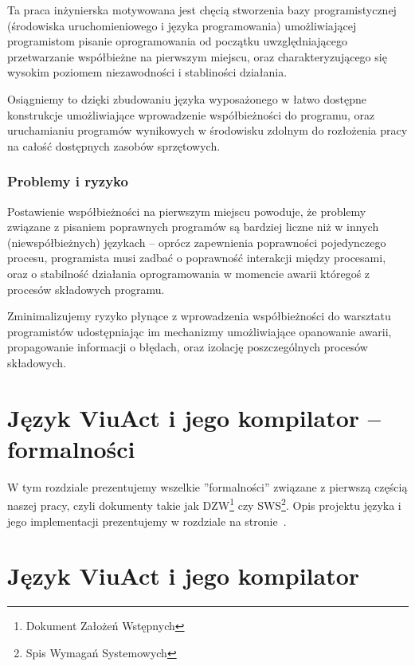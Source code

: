 \documentclass[11pt,oneside,a4paper,titlepage,onecolumn]{book}
\begin{document}
Ta praca inżynierska motywowana jest chęcią stworzenia bazy programistycznej (środowiska uruchomieniowego i
języka programowania) umożliwiającej programistom pisanie oprogramowania od początku uwzględniającego
przetwarzanie współbieżne na pierwszym miejscu, oraz charakteryzującego się wysokim poziomem niezawodności i
stabliności działania.

Osiągniemy to dzięki zbudowaniu języka wyposażonego w łatwo dostępne konstrukcje umożliwiające wprowadzenie
współbieżności do programu, oraz uruchamianiu programów wynikowych w środowisku zdolnym do rozłożenia pracy na
całość dostępnych zasobów sprzętowych.

\subsection{Problemy i ryzyko}

Postawienie współbieżności na pierwszym miejscu powoduje, że problemy związane z pisaniem poprawnych programów
są bardziej liczne niż w innych (niewspółbieżnych) językach -- oprócz zapewnienia poprawności pojedynczego
procesu, programista musi zadbać o poprawność interakcji między procesami, oraz o stabilność działania
oprogramowania w momencie awarii któregoś z procesów składowych programu.

Zminimalizujemy ryzyko płynące z wprowadzenia współbieżności do warsztatu programistów udostępniając im
mechanizmy umożliwiające opanowanie awarii, propagowanie informacji o błędach, oraz izolację poszczególnych
procesów składowych.

\chapter{Język ViuAct i jego kompilator -- formalności}

W tym rozdziale prezentujemy wszelkie ''formalności'' związane z pierwszą częścią naszej pracy, czyli
dokumenty takie jak DZW\footnote{Dokument Założeń Wstępnych} czy SWS\footnote{Spis Wymagań Systemowych}.
Opis projektu języka i jego implementacji prezentujemy w rozdziale  na
stronie~\pageref{jezyk_viuact_i_jego_kompilator}.



\chapter{Język ViuAct i jego kompilator}
\label{jezyk_viuact_i_jego_kompilator}
\end{document}
